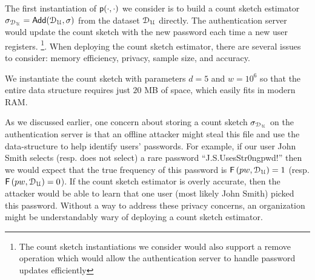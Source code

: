 The first instantiation of $\textsf{p}(\cdot,\cdot) $ we consider is to build a count sketch estimator $\sigma_{\mathcal{D}_{{\mathcal{U}}}} = \mathsf{Add}(\mathcal{D}_{{\mathcal{U}}},\sigma) $ from the dataset $\mathcal{D}_{{\mathcal{U}}} $ directly. The authentication server would update the count sketch with the new password each time a new user registers. \footnote{The count sketch instantiations we consider would also support a remove operation which would allow the authentication server to handle password updates efficiently}. When deploying the count sketch estimator, there are several issues to consider: memory efficiency, privacy, sample size, and accuracy. 



 We instantiate the count sketch with parameters $d=5$ and $w=10^6$ so that the entire data structure requires just $20$ MB of space, which easily fits in modern RAM. 



 As we discussed earlier, one concern about storing a count sketch $\sigma_{\mathcal{D}_{{\mathcal{U}}}} $ on the authentication server is that an offline attacker might steal this file and use the data-structure to help identify users' passwords. For example, if our user John Smith selects (resp. does not select) a rare password ``J.S.UsesStr0ngpwd!'' then we would expect that the true frequency of this password is $\mathsf{F}\left(pw, \mathcal{D}_{{\mathcal{U}}} \right)=1$ (resp. $\mathsf{F}\left(pw, \mathcal{D}_{{\mathcal{U}}} \right)=0$). If the count sketch estimator is overly accurate, then the attacker would be able to learn that one user (most likely John Smith) picked this password. Without a way to address these privacy concerns, an organization might be understandably wary of deploying a count sketch estimator. 


